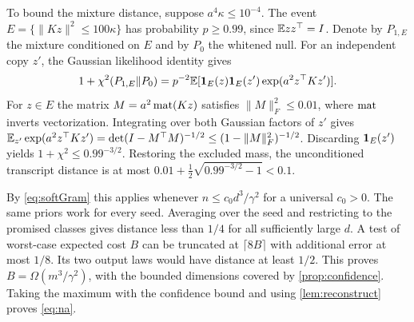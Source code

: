 To bound the mixture distance, suppose \(a^4\kappa\le10^{-4}\). The event \(E=\{\|Kz\|^2\le100\kappa\}\) has probability \(p\ge0.99\), since \(\mathbb E zz^\top=I\). Denote by \(P_{1,E}\) the mixture conditioned on \(E\) and by \(P_0\) the whitened null. For an independent copy \(z'\), the Gaussian likelihood identity gives
\[
 1+\chi^2(P_{1,E}\Vert P_0)
 =p^{-2}\mathbb E[\mathbf 1_E(z)\mathbf 1_E(z')\exp(a^2 z^\top K z')].
\]
For \(z\in E\) the matrix \(M=a^2\operatorname{mat}(Kz)\) satisfies \(\|M\|_F^2\le0.01\), where \(\operatorname{mat}\) inverts vectorization. Integrating over both Gaussian factors of \(z'\) gives \(\mathbb E_{z'}\exp(a^2z^\top Kz')=\det(I-M^\top M)^{-1/2}\le(1-\|M\|_F^2)^{-1/2}\). Discarding \(\mathbf 1_E(z')\) yields \(1+\chi^2\le0.99^{-3/2}\). Restoring the excluded mass, the unconditioned transcript distance is at most \(0.01+\tfrac12\sqrt{0.99^{-3/2}-1}<0.1\).

By \eqref{eq:softGram} this applies whenever \(n\le c_0d^3/\gamma^2\) for a universal \(c_0>0\). The same priors work for every seed. Averaging over the seed and restricting to the promised classes gives distance less than \(1/4\) for all sufficiently large \(d\). A test of worst-case expected cost \(B\) can be truncated at \(\lceil8B\rceil\) with additional error at most \(1/8\). Its two output laws would have distance at least \(1/2\). This proves \(B=\Omega(m^3/\gamma^2)\), with the bounded dimensions covered by \cref{prop:confidence}. Taking the maximum with the confidence bound and using \cref{lem:reconstruct} proves \eqref{eq:na}.
